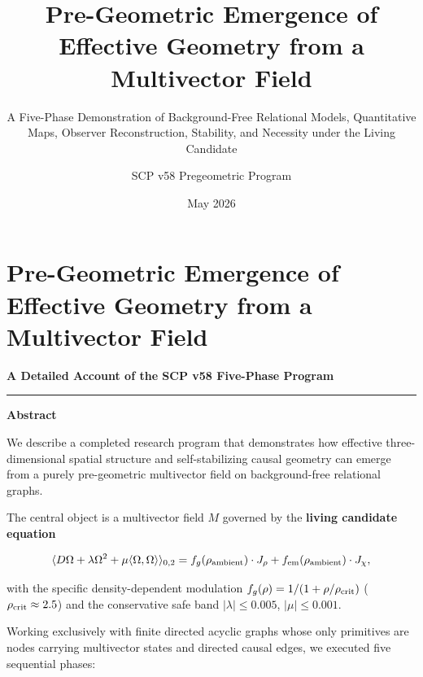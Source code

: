 \documentclass[
  11pt,
  a4paper,
]{article}
\title{Pre-Geometric Emergence of Effective Geometry from a Multivector
Field}
\subtitle{A Five-Phase Demonstration of Background-Free Relational
Models, Quantitative Maps, Observer Reconstruction, Stability, and
Necessity under the Living Candidate}
\author{SCP v58 Pregeometric Program}
\date{May 2026}
\begin{document}
\maketitle

\section{Pre-Geometric Emergence of Effective Geometry from a
Multivector
Field}\label{pre-geometric-emergence-of-effective-geometry-from-a-multivector-field}

\textbf{A Detailed Account of the SCP v58 Five-Phase Program}

\begin{center}\rule{0.5\linewidth}{0.5pt}\end{center}

\textbf{Abstract}

We describe a completed research program that demonstrates how effective
three-dimensional spatial structure and self-stabilizing causal geometry
can emerge from a purely pre-geometric multivector field on
background-free relational graphs.

The central object is a multivector field \(M\) governed by the
\textbf{living candidate equation}

\[
\langle D \Omega + \lambda \Omega^2 + \mu \langle \Omega, \Omega \rangle \rangle_{0,2}
= f_g(\rho_{\rm ambient}) \cdot J_\rho + f_{\rm em}(\rho_{\rm ambient}) \cdot J_\chi,
\]

with the specific density-dependent modulation
\(f_g(\rho) = 1/(1 + \rho / \rho_{\rm crit})\)
(\(\rho_{\rm crit} \approx 2.5\)) and the conservative safe band
\(|\lambda| \le 0.005\), \(|\mu| \le 0.001\).

Working exclusively with finite directed acyclic graphs whose only
primitives are nodes carrying multivector states and directed causal
edges, we executed five sequential phases:
\end{document}
